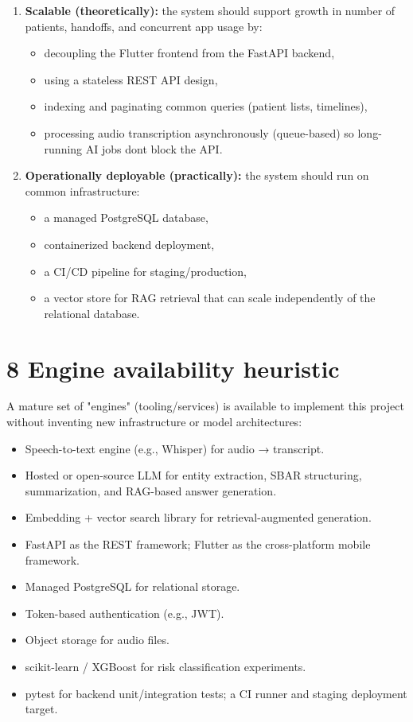\documentclass[
]{article}
\begin{document}
\begin{enumerate}
\def\labelenumi{\arabic{enumi}.}
\item
  \textbf{Scalable (theoretically):} the system should support growth in
  number of patients, handoffs, and concurrent app usage by:

  \begin{itemize}
  \item
    decoupling the Flutter frontend from the FastAPI backend,
  \item
    using a stateless REST API design,
  \item
    indexing and paginating common queries (patient lists, timelines),
  \item
    processing audio transcription asynchronously (queue-based) so
    long-running AI jobs don\textquotesingle t block the API.
  \end{itemize}
\item
  \textbf{Operationally deployable (practically):} the system should run
  on common infrastructure:

  \begin{itemize}
  \item
    a managed PostgreSQL database,
  \item
    containerized backend deployment,
  \item
    a CI/CD pipeline for staging/production,
  \item
    a vector store for RAG retrieval that can scale independently of the
    relational database.
  \end{itemize}
\end{enumerate}

\section{8 Engine availability
heuristic}\label{engine-availability-heuristic}

A mature set of "engines" (tooling/services) is available to implement
this project without inventing new infrastructure or model
architectures:

\begin{itemize}
\item
  Speech-to-text engine (e.g., Whisper) for audio → transcript.
\item
  Hosted or open-source LLM for entity extraction, SBAR structuring,
  summarization, and RAG-based answer generation.
\item
  Embedding + vector search library for retrieval-augmented generation.
\item
  FastAPI as the REST framework; Flutter as the cross-platform mobile
  framework.
\item
  Managed PostgreSQL for relational storage.
\item
  Token-based authentication (e.g., JWT).
\item
  Object storage for audio files.
\item
  scikit-learn / XGBoost for risk classification experiments.
\item
  pytest for backend unit/integration tests; a CI runner and staging
  deployment target.
\end{itemize}
\end{document}
